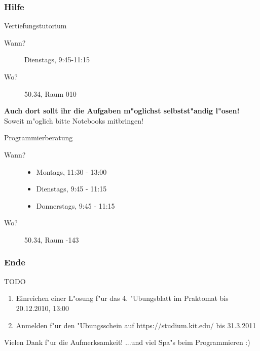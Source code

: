 \documentclass{beamer}
\begin{document}
\begin{frame}
\frametitle{Hilfe}
\begin{block}{Vertiefungstutorium}
\begin{description}
\item[Wann?] Dienstags, 9:45-11:15
\item[Wo?] 50.34, Raum 010
\end{description}
\textbf{Auch dort sollt ihr die Aufgaben m"oglichst selbstst"andig l"osen!}
\alert{Soweit m"oglich bitte Notebooks mitbringen!}
\end{block}

\begin{block}{Programmierberatung}
\begin{description}
\item[Wann?]
\begin{itemize}
\item Montags, 11:30 - 13:00
\item Dienstags, 9:45 - 11:15
\item Donnerstags, 9:45 - 11:15
\end{itemize}
\item[Wo?] 50.34, Raum -143
\end{description}
\end{block}
\end{frame}


\begin{frame}
\frametitle{Ende}
\begin{block}{TODO}
\begin{enumerate}
\item Einreichen einer L"osung f"ur das 4. "Ubungsblatt im Praktomat bis \alert{20.12.2010, 13:00}
\item Anmelden f"ur den "Ubungsschein auf https://studium.kit.edu/ bis \alert{31.3.2011}
\end{enumerate}
\end{block}

\begin{block}{Vielen Dank f"ur die Aufmerksamkeit!}
...und viel Spa"s beim Programmieren :)
\end{block}
\end{frame}
\end{document}
